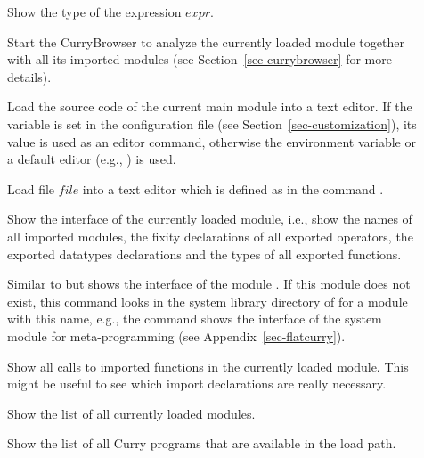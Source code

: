 \begin{description}
\item[]
Show the type of the expression $expr$.

\item[]
Start the CurryBrowser to analyze the currently loaded
module together with all its imported modules
(see Section~\ref{sec-currybrowser} for more details).

\item[]
Load the source code of the current main module into a text editor.
If the variable  is set in the
configuration file 
(see Section~\ref{sec-customization}),
its value is used as an editor command, otherwise
the environment variable 
or a default editor (e.g., ) is used.

\item[]
Load file $file$ into a text editor which is defined
as in the command .

\item[]
Show the interface of the currently loaded
module, i.e., show the names of all imported modules,
the fixity declarations of all exported operators,
the exported datatypes declarations and the types
of all exported functions.

\item[]
Similar to 
but shows the interface of the module .
If this module does not exist, this command looks in the
system library directory of \CYS for a module with this name,
e.g., the command  shows the interface
of the system module  for meta-programming
(see Appendix~\ref{sec-flatcurry}).

\item[]
Show all calls to imported functions in the currently loaded module.
This might be useful to see which import declarations are really necessary.

\item[]
Show the list of all currently loaded modules.

\item[]
Show the list of all Curry programs that are available in the load path.


\end{description}
